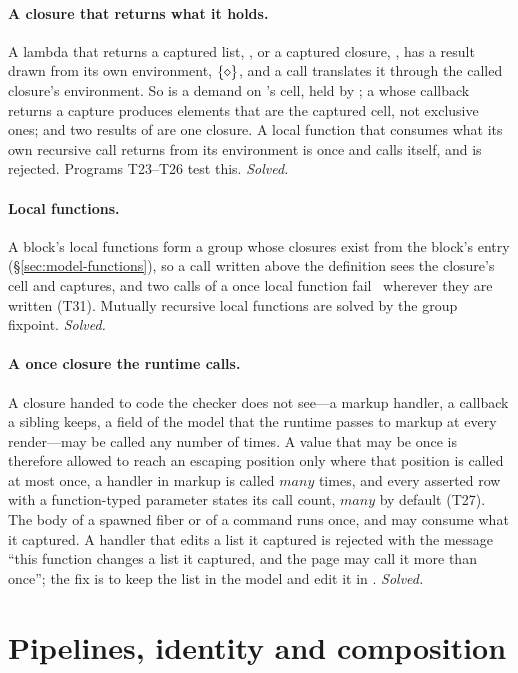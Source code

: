 \paragraph{A closure that returns what it holds.} A lambda that returns a captured list,
, or a captured closure, , has a result drawn from its own
environment, $\{\diamond\}$, and a call translates it through the called closure's environment. So
 is a demand on 's cell, held by ; a  whose
callback returns a capture produces elements that are the captured cell, not exclusive ones; and two
results of  are one closure. A local function that consumes what its own recursive call
returns from its environment is once and calls itself, and is rejected. Programs T23--T26 test this.
\emph{Solved.}

\paragraph{Local functions.} A block's local functions form a group whose closures exist from the
block's entry (\S\ref{sec:model-functions}), so a call written above the definition sees the closure's
cell and captures, and two calls of a once local function fail \Dead\ wherever they are written (T31).
Mutually recursive local functions are solved by the group fixpoint. \emph{Solved.}

\paragraph{A once closure the runtime calls.} A closure handed to code the checker does not see---a
markup handler, a callback a sibling keeps, a field of the model that the runtime passes to markup at
every render---may be called any number of times. A value that may be once is therefore allowed to reach an escaping
position only where that position is called at most once, a handler in markup is called
$\mathit{many}$ times, and every asserted row with a function-typed parameter states its call count,
$\mathit{many}$ by default (T27). The body of a spawned fiber or of a command runs once, and may
consume what it captured. A handler that edits a list it captured is rejected with the
message ``this function changes a list it captured, and the page may call it more than once''; the fix is
to keep the list in the model and edit it in . \emph{Solved.}

\section{Pipelines, identity and composition}
\label{sec:hard-pipelines}

